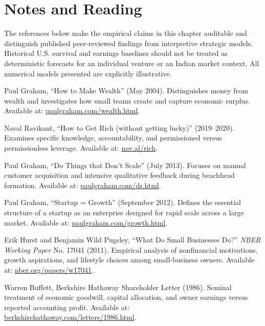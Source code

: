 \section*{Notes and Reading}

The references below make the empirical claims in this chapter auditable and distinguish published peer-reviewed findings from interpretive strategic models. Historical U.S. survival and earnings baselines should not be treated as deterministic forecasts for an individual venture or an Indian market context. All numerical models presented are explicitly illustrative.

\begin{enumerate}[label={[\arabic*]},leftmargin=14pt,itemsep=3pt,topsep=2pt,parsep=0pt]
  \item Paul Graham, ``How to Make Wealth'' (May 2004). Distinguishes money from wealth and investigates how small teams create and capture economic surplus. Available at: \href{https://www.paulgraham.com/wealth.html}{paulgraham.com/wealth.html}.
  \item Naval Ravikant, ``How to Get Rich (without getting lucky)'' (2019--2020). Examines specific knowledge, accountability, and permissioned versus permissionless leverage. Available at: \href{https://nav.al/rich}{nav.al/rich}.
  \item Paul Graham, ``Do Things that Don't Scale'' (July 2013). Focuses on manual customer acquisition and intensive qualitative feedback during beachhead formation. Available at: \href{https://paulgraham.com/ds.html}{paulgraham.com/ds.html}.
  \item Paul Graham, ``Startup = Growth'' (September 2012). Defines the essential structure of a startup as an enterprise designed for rapid scale across a large market. Available at: \href{https://www.paulgraham.com/growth.html}{paulgraham.com/growth.html}.
  \item Erik Hurst and Benjamin Wild Pugsley, ``What Do Small Businesses Do?'' \textit{NBER Working Paper} No. 17041 (2011). Empirical analysis of nonfinancial motivations, growth aspirations, and lifestyle choices among small-business owners. Available at: \href{https://www.nber.org/papers/w17041}{nber.org/papers/w17041}.
  \item Warren Buffett, Berkshire Hathaway Shareholder Letter (1986). Seminal treatment of economic goodwill, capital allocation, and owner earnings versus reported accounting profit. Available at: \href{https://www.berkshirehathaway.com/letters/1986.html}{berkshirehathaway.com/letters/1986.html}.

\end{enumerate}
